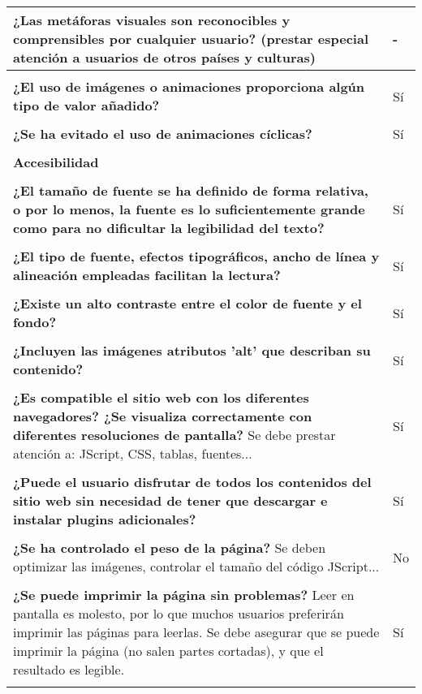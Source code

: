 \begin{longtable}[H]{p{31em}|p{5em}}
\textbf{¿Las metáforas visuales son reconocibles y comprensibles por cualquier usuario?} (prestar especial atención a usuarios de otros países y culturas)  & - \\ \hline \\[-1em]
\textbf{¿El uso de imágenes o animaciones proporciona algún tipo de valor añadido? } & Sí \\ \hline \\[-1em]
\textbf{¿Se ha evitado el uso de animaciones cíclicas?} & Sí \\ \hline \\[-1em]
\multicolumn{2}{p{36em}}{\cellcolor[rgb]{ .851,  .886,  .953} \textbf{Accesibilidad}} \\ \hline \\[-1em]
\textbf{¿El tamaño de fuente se ha definido de forma relativa, o por lo menos, la fuente es lo suficientemente grande como para no dificultar la legibilidad del texto? } & Sí \\ \hline \\[-1em]
\textbf{¿El tipo de fuente, efectos tipográficos, ancho de línea y alineación empleadas facilitan la lectura?} & Sí \\ \hline \\[-1em]
\textbf{¿Existe un alto contraste entre el color de fuente y el fondo?} & Sí \\ \hline \\[-1em]
\textbf{¿Incluyen las imágenes atributos 'alt' que describan su contenido? } & Sí \\ \hline \\[-1em]
\textbf{¿Es compatible el sitio web con los diferentes navegadores? ¿Se visualiza correctamente con diferentes resoluciones de pantalla?} Se debe prestar atención a: JScript, CSS, tablas, fuentes...  & Sí \\ \hline \\[-1em]
\textbf{¿Puede el usuario disfrutar de todos los contenidos del sitio web sin necesidad de tener que descargar e instalar plugins adicionales?} & Sí \\ \hline \\[-1em]
\textbf{¿Se ha controlado el peso de la página?} Se deben optimizar las imágenes, controlar el tamaño del código JScript...  & No \\ \hline \\[-1em]
\textbf{¿Se puede imprimir la página sin problemas?} Leer en pantalla es molesto, por lo que muchos usuarios preferirán imprimir las páginas para leerlas. Se debe asegurar que se puede imprimir la página (no salen partes cortadas), y que el resultado es legible.  & Sí \\ \hline \\[-1em]

\end{longtable}
